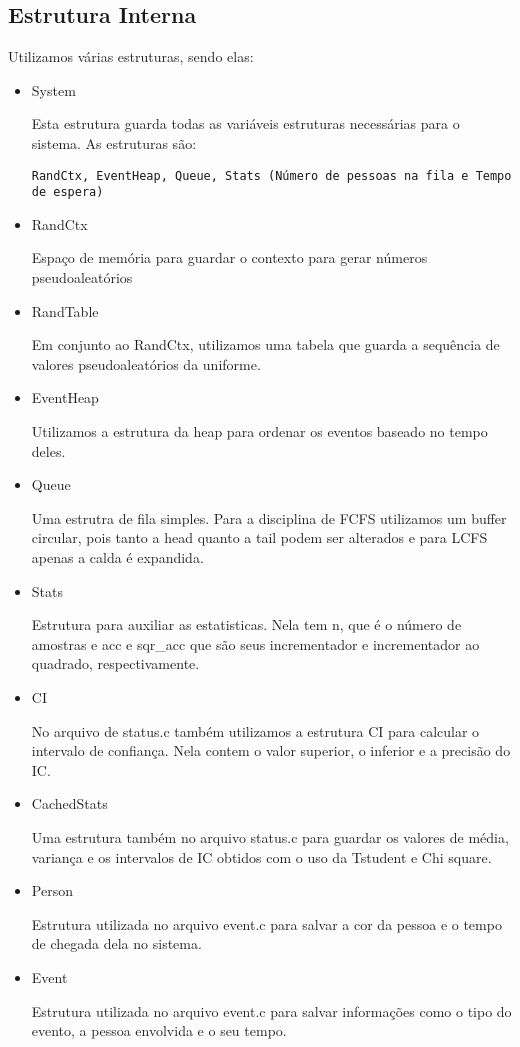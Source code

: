 \documentclass[a4paper]{article}
\begin{document}
\subsection{Estrutura Interna}
Utilizamos várias estruturas, sendo elas:
\begin{itemize}
    \item System

    Esta estrutura guarda todas as variáveis estruturas necessárias para o sistema. As estruturas são:

    \texttt{RandCtx, EventHeap, Queue,
        Stats (Número de pessoas na fila e Tempo de espera)}
    \item RandCtx

    Espaço de memória para guardar o contexto para gerar números pseudoaleatórios

    \item RandTable

    Em conjunto ao RandCtx, utilizamos uma tabela que guarda a sequência de valores pseudoaleatórios da uniforme.

    \item EventHeap

    Utilizamos a estrutura da heap para ordenar os eventos baseado no tempo deles.

    \item Queue

    Uma estrutra de fila simples. Para a disciplina de FCFS utilizamos um buffer circular, pois tanto a head quanto a tail podem ser alterados e para LCFS apenas a calda é expandida.

    \item Stats

    Estrutura para auxiliar as estatisticas. Nela tem n, que é o número de amostras e acc e sqr\_acc que são seus incrementador e incrementador ao quadrado, respectivamente.

    \item CI

    No arquivo de status.c também utilizamos a estrutura CI para calcular o intervalo de confiança. Nela contem o valor superior, o inferior e a precisão do IC.

    \item CachedStats

    Uma estrutura também no arquivo status.c para guardar os valores de média, variança e os intervalos de IC obtidos com o uso da Tstudent e Chi square.

    \item Person

    Estrutura utilizada no arquivo event.c para salvar a cor da pessoa e o tempo de chegada dela no sistema.

    \item Event

    Estrutura utilizada no arquivo event.c para salvar informações como o tipo do evento, a pessoa envolvida e o seu tempo.

\end{itemize}
\end{document}
